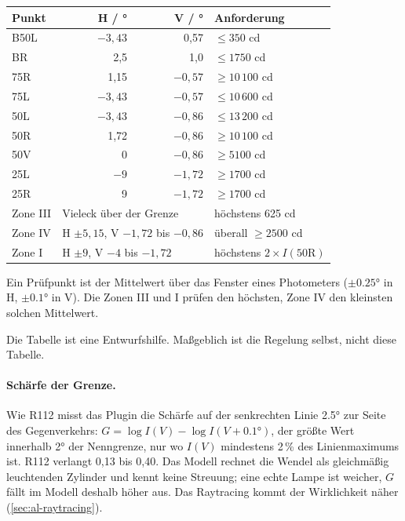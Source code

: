\begin{center}
\begin{tabular}{lrrl}
\toprule
Punkt & H / \si{\degree} & V / \si{\degree} & Anforderung \\
\midrule
B50L & $-3{,}43$ & 0,57 & $\leq 350$ cd \\
BR & 2,5 & 1,0 & $\leq 1750$ cd \\
75R & 1,15 & $-0{,}57$ & $\geq 10\,100$ cd \\
75L & $-3{,}43$ & $-0{,}57$ & $\leq 10\,600$ cd \\
50L & $-3{,}43$ & $-0{,}86$ & $\leq 13\,200$ cd \\
50R & 1,72 & $-0{,}86$ & $\geq 10\,100$ cd \\
50V & 0 & $-0{,}86$ & $\geq 5100$ cd \\
25L & $-9$ & $-1{,}72$ & $\geq 1700$ cd \\
25R & 9 & $-1{,}72$ & $\geq 1700$ cd \\
Zone III & \multicolumn{2}{l}{Vieleck über der Grenze} & höchstens 625 cd \\
Zone IV & \multicolumn{2}{l}{H $\pm 5{,}15$, V $-1{,}72$ bis $-0{,}86$} & überall $\geq 2500$ cd \\
Zone I & \multicolumn{2}{l}{H $\pm 9$, V $-4$ bis $-1{,}72$} & höchstens $2 \times I(\text{50R})$ \\
\bottomrule
\end{tabular}
\end{center}

Ein Prüfpunkt ist der Mittelwert über das Fenster eines Photometers ($\pm \ang{0.25}$ in H,
$\pm \ang{0.1}$ in V). Die Zonen III und I prüfen den höchsten, Zone IV den kleinsten solchen
Mittelwert.

\begin{warnung}
Die Tabelle ist eine Entwurfshilfe. Maßgeblich ist die Regelung selbst, nicht diese Tabelle.
\end{warnung}

\paragraph{Schärfe der Grenze.} Wie R112 misst das Plugin die Schärfe auf der senkrechten Linie
\ang{2.5} zur Seite des Gegenverkehrs:
$G = \log I(V) - \log I(V + \ang{0.1})$, der größte Wert innerhalb \ang{2} der Nenngrenze, nur wo
$I(V)$ mindestens 2\,\% des Linienmaximums ist. R112 verlangt 0,13 bis 0,40. Das Modell rechnet die
Wendel als gleichmäßig leuchtenden Zylinder und kennt keine Streuung; eine echte Lampe ist weicher,
$G$ fällt im Modell deshalb höher aus. Das Raytracing kommt der Wirklichkeit näher
(\autoref{sec:al-raytracing}).

